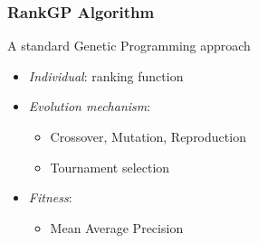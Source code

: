 \documentclass{beamer}
\begin{document}

\begin{frame}
    \frametitle{RankGP Algorithm}
    A standard Genetic Programming approach
    \begin{itemize}
    \item \emph{Individual}: ranking function
    \item \emph{Evolution mechanism}:
        \begin{itemize}
        \item Crossover, Mutation, Reproduction
        \item Tournament selection
        \end{itemize}
    \item \emph{Fitness}:
        \begin{itemize}
        \item Mean Average Precision
        \end{itemize}
    \end{itemize}
\end{frame}




\end{document}
